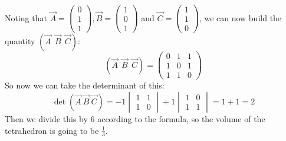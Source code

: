 \documentclass{article}
\begin{document}
\begin{solution}
	Noting that $\vec A = \begin{pmatrix} 0 \\ 1\\1 \end{pmatrix}, \vec B = \begin{pmatrix} 1 \\ 0\\1
	\end{pmatrix}$ and $\vec C = \begin{pmatrix} 1 \\ 1\\0 \end{pmatrix}$, we can now build the 
	quantity $(\vec A \ \ \vec B \ \ \vec C)$:
	\[
		(\vec A \ \ \vec B \ \ \vec C) = \begin{pmatrix} 0 & 1 & 1 \\ 1 & 0 & 1\\ 1 & 1 & 0 \end{pmatrix} 
	\] 
	So now we can take the determinant of this:
	\[
		\det (\vec A \ \vec B \ \vec C) = - 1 \begin{vmatrix} 1 & 1 \\ 1 & 0 \end{vmatrix} + 1 
		\begin{vmatrix} 1 & 0 \\ 1 & 1 \end{vmatrix} = 1 + 1 = 2
	\] 
	Then we divide this by 6 according to the formula, so the volume of the tetrahedron is going to be
	$\frac{1}{3}$.

\end{solution}

\phline
\end{document}
